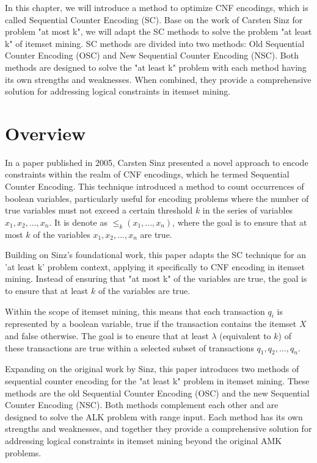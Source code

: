 In this chapter, we will introduce a method to optimize CNF encodings, which is called Sequential Counter Encoding (SC).
Base on the work of Carsten Sinz for problem "at most k",
we will adapt the SC methods to solve the problem "at least k" of itemset mining.
SC methods are divided into two methods: Old Sequential Counter Encoding (OSC) and New Sequential Counter Encoding (NSC).
Both methods are designed to solve the "at least k" problem with each method having its own strengths and weaknesses.
When combined, they provide a comprehensive solution for addressing logical constraints in itemset mining.

\section{Overview}

In a paper published in 2005, Carsten Sinz\cite{carstensinz} presented a novel approach to encode constraints within the realm of CNF encodings,
which he termed Sequential Counter Encoding.
This technique introduced a method to count occurrences of boolean variables,
particularly useful for encoding problems where the number of true variables
must not exceed a certain threshold $k$ in the series of variables $x_1, x_2, ..., x_n$.
It is denote as $\le _k(x_1,...,x_n)$, where the goal is to ensure that at most $k$ of the variables $x_1, x_2,..., x_n$ are true.

Building on Sinz's foundational work, this paper adapts the SC technique
for an 'at least k' problem context,
applying it specifically to CNF encoding in itemset mining.
Instead of ensuring that "at most k" of the variables are true, the goal is to ensure that at least $k$ of the variables are true.

Within the scope of itemset mining, this means that each transaction $q_i$ is represented by a boolean variable,
true if the transaction contains the itemset $X$ and false otherwise.
The goal is to ensure that at least $\lambda$ (equivalent to $k$)
of these transactions are true within a selected subset of transactions $q_1, q_2,..., q_n$.

Expanding on the original work by Sinz, this paper introduces two methods of sequential counter encoding for the "at least k" problem in itemset mining.
These methods are the old Sequential Counter Encoding (OSC) and the new Sequential Counter Encoding (NSC).
Both methods complement each other and are designed to solve the ALK problem with range input.
Each method has its own strengths and weaknesses, and together they provide a comprehensive solution for addressing logical constraints in itemset mining beyond the original AMK problems.

